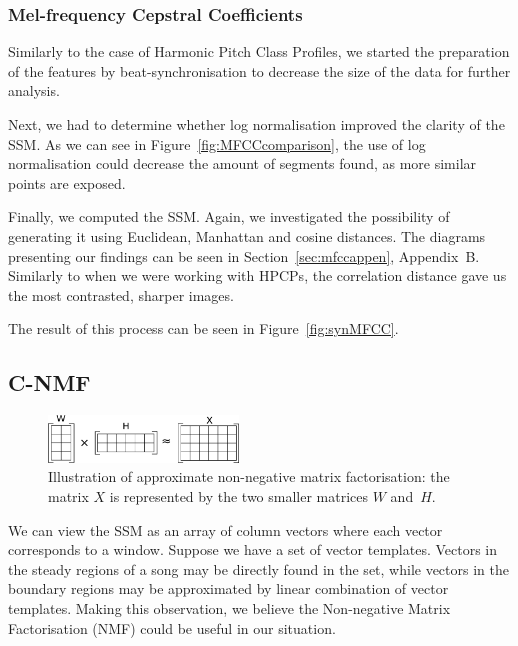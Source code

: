 \subsubsection*{Mel-frequency Cepstral Coefficients}


Similarly to the case of Harmonic Pitch Class Profiles, we started the preparation of the features by beat-synchronisation to decrease the size of the data for further analysis. 

Next, we had to determine whether log normalisation improved the clarity of the SSM. As we can see in Figure~\ref{fig:MFCCcomparison}, the use of log normalisation could decrease the amount of segments found, as more similar points are exposed.

Finally, we computed the SSM. Again, we investigated the possibility of generating it using Euclidean, Manhattan and cosine distances. The diagrams presenting our findings can be seen in Section~\ref{sec:mfccappen}, Appendix~B. Similarly to when we were working with HPCPs, the correlation distance gave us the most contrasted, sharper images. 

The result of this process can be seen in Figure~\ref{fig:synMFCC}.

\vspace{10pt}

\subsection{C-NMF}


\begin{figure}
\vspace{-20pt}
  \begin{center}
    \includegraphics[width=0.45\textwidth]{Figures/NMF}
  \end{center}
  \caption{Illustration of approximate non-negative matrix factorisation: the matrix $X$ is represented by the two smaller matrices $W$ and~$H$.}
\label{fig:NMF}
\end{figure}

We can view the SSM as an array of column vectors where each vector corresponds to a window. Suppose we have a set of vector templates. Vectors in the steady regions of a song may be directly found in the set, while vectors in the boundary regions may be approximated by linear combination of vector templates. Making this observation, we believe the Non-negative Matrix Factorisation (NMF) could be useful in our situation.

